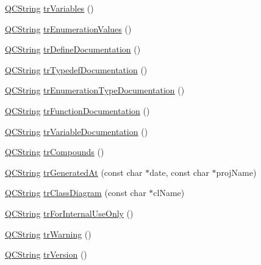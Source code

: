 \begin{DoxyCompactItemize}
\item 
\mbox{\hyperlink{class_q_c_string}{Q\+C\+String}} \mbox{\hyperlink{class_translator_portuguese_a7863f5711f87ec7863e5e77914cfa0d8}{tr\+Variables}} ()
\item 
\mbox{\hyperlink{class_q_c_string}{Q\+C\+String}} \mbox{\hyperlink{class_translator_portuguese_a1b3e078635dcf50123d39ca272fda3b9}{tr\+Enumeration\+Values}} ()
\item 
\mbox{\hyperlink{class_q_c_string}{Q\+C\+String}} \mbox{\hyperlink{class_translator_portuguese_a08b6adb52f21b563a4f6521fd6f32fd6}{tr\+Define\+Documentation}} ()
\item 
\mbox{\hyperlink{class_q_c_string}{Q\+C\+String}} \mbox{\hyperlink{class_translator_portuguese_ad4fa7d15e54a3cf40a5b84e904eee276}{tr\+Typedef\+Documentation}} ()
\item 
\mbox{\hyperlink{class_q_c_string}{Q\+C\+String}} \mbox{\hyperlink{class_translator_portuguese_ae3ce12563127799cd09934f433cf678a}{tr\+Enumeration\+Type\+Documentation}} ()
\item 
\mbox{\hyperlink{class_q_c_string}{Q\+C\+String}} \mbox{\hyperlink{class_translator_portuguese_a277d6b492ad5399b1e8e24f9cc8d2715}{tr\+Function\+Documentation}} ()
\item 
\mbox{\hyperlink{class_q_c_string}{Q\+C\+String}} \mbox{\hyperlink{class_translator_portuguese_a20cc092c5f3ceeb96718275d57bf807c}{tr\+Variable\+Documentation}} ()
\item 
\mbox{\hyperlink{class_q_c_string}{Q\+C\+String}} \mbox{\hyperlink{class_translator_portuguese_aa974995ae597bf8818937c9e00a4c103}{tr\+Compounds}} ()
\item 
\mbox{\hyperlink{class_q_c_string}{Q\+C\+String}} \mbox{\hyperlink{class_translator_portuguese_a693f9bfd3274ee9d4213cf04bf20192c}{tr\+Generated\+At}} (const char $\ast$date, const char $\ast$proj\+Name)
\item 
\mbox{\hyperlink{class_q_c_string}{Q\+C\+String}} \mbox{\hyperlink{class_translator_portuguese_a16a9449da5b8b5b9d8d930367ac9e089}{tr\+Class\+Diagram}} (const char $\ast$cl\+Name)
\item 
\mbox{\hyperlink{class_q_c_string}{Q\+C\+String}} \mbox{\hyperlink{class_translator_portuguese_a27fad9077f707adbed8f5a00060e3492}{tr\+For\+Internal\+Use\+Only}} ()
\item 
\mbox{\hyperlink{class_q_c_string}{Q\+C\+String}} \mbox{\hyperlink{class_translator_portuguese_af7a7513d569c37b9133bb8c63e9b6420}{tr\+Warning}} ()
\item 
\mbox{\hyperlink{class_q_c_string}{Q\+C\+String}} \mbox{\hyperlink{class_translator_portuguese_a6026e4f3c598b15748761d53cc48914f}{tr\+Version}} ()

\end{DoxyCompactItemize}
